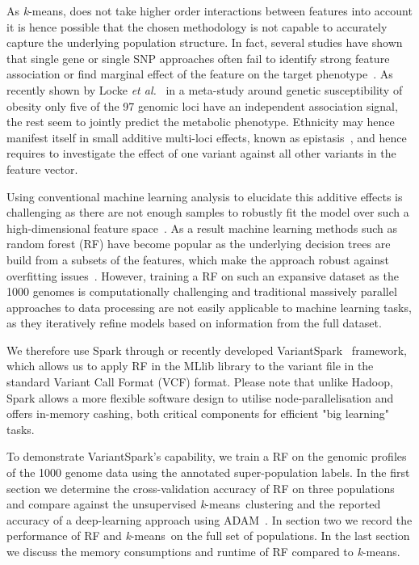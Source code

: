 \documentclass{llncs}
\newcommand{\variantSpark}{{\sc VariantSpark}}
\newcommand{\kMeans}{\textit{k}-means}
\begin{document}
{As \kMeans, does not take higher order interactions between features into account it is hence possible that the chosen methodology is not capable to accurately capture the underlying population structure. 
In fact, several studies have shown that single gene or single SNP approaches often fail to identify strong feature association or find marginal effect of the feature on the target phenotype~\cite{Bureau2005,Yoo2012,Qi2012}. 
As recently shown by Locke {\it et al.}~\cite{Locke2015} in a meta-study around genetic susceptibility of obesity only five of the 97 genomic loci have an independent association signal, the rest seem to jointly predict the metabolic phenotype.
Ethnicity may hence manifest itself in small additive multi-loci effects, known as epistasis~\cite{Mackay2014}, and hence requires to investigate the effect of one variant against all other variants in the feature vector.

Using conventional machine learning analysis to elucidate this additive effects is challenging as there are not enough samples to robustly fit the model over such a high-dimensional feature space~\cite{Chen2012}. 
As a result machine learning methods such as random forest (RF) have become popular as the underlying decision trees are build from a subsets of the features, which make the approach robust against overfitting issues~\cite{Breiman2001}. 
However, training a RF on such an expansive dataset as the 1000 genomes is computationally challenging and traditional massively parallel approaches to data processing are not easily applicable to machine learning tasks, as they iteratively refine models based on information from the full dataset. 


We therefore use {\sc Spark} through or recently developed \variantSpark~\cite{OBrien} framework, which allows us to apply RF in the MLlib library to the variant file in the standard Variant Call Format (VCF) format. 
Please note that unlike {\sc Hadoop}, {\sc Spark} allows a more flexible software design to utilise node-parallelisation and offers in-memory cashing, both critical components for efficient "big learning" tasks. 

To demonstrate \variantSpark's capability, we train a RF on the genomic profiles of the 1000 genome data using the annotated super-population labels. 
In the first section we determine the cross-validation accuracy of RF on three populations and compare against the unsupervised \kMeans\ clustering and the reported accuracy of a deep-learning approach using {\sc ADAM}~\cite{Massie2013}.
In section two we record the performance of RF and \kMeans\ on the full set of populations. 
In the last section we discuss the memory consumptions and runtime of RF compared to \kMeans.


}
\end{document}
